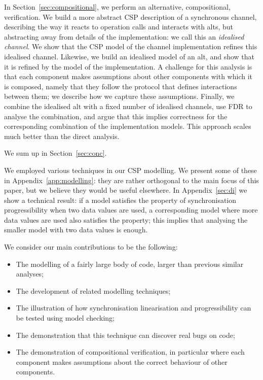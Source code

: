 In Section~\ref{sec:compositional}, we perform an alternative, compositional,
verification.  We build a more abstract CSP description of a synchronous
channel, describing the way it reacts to operation calls and interacts with
alts, but abstracting away from details of the implementation: we call this an
\emph{idealised channel}.  We show that the CSP model of the channel
implementation refines this idealised channel.  Likewise, we build an
idealised model of an alt, and show that it is refined by the model of the
implementation.  A challenge for this analysis is that each component makes
assumptions about other components with which it is composed, namely that they
follow the protocol that defines interactions between them; we describe how we
capture these assumptions.  Finally, we combine the idealised alt with a fixed
number of idealised channels, use FDR to analyse the combination, and argue
that this implies correctness for the corresponding combination of the
implementation models.  This approach scales much better than the direct
analysis.

We sum up in Section~\ref{sec:conc}.

We employed various techniques in our CSP modelling.  We present some of these
in Appendix~\ref{app:modelling}: they are rather orthogonal to the main focus
of this paper, but we believe they would be useful elsewhere.  In
Appendix~\ref{sec:di} we show a technical result: if a model satisfies the
property of synchronisation progressibility when two data values are used, a
corresponding model where more data values are used also satisfies the
property; this implies that analysing the smaller model with two data values
is enough. 

We consider our main contributions to be the following:
%
\begin{itemize}
\item The modelling of a fairly large body of code, larger than previous
  similar analyses;

\item The development of related modelling techniques;

\item The illustration of how synchronisation linearisation and
  progressibility can be tested using model checking;

\item The demonstration that this technique can discover real bugs on code;

\item The demonstration of compositional verification, in particular where
  each component makes assumptions about the correct behaviour of other
  components. 
\end{itemize}


